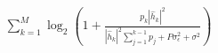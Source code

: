 \documentclass[preview]{standalone}
\begin{document}
\begin{align*}
\sum_{k=1}^{M}\log_2\left( 1 + \frac{p_k\left|{\hat{h}_k}\right|^2}{\left|{\hat{h}_k}\right|^2\sum_{j=1}^{k-1}p_j+P\sigma^2_{\epsilon} + \sigma^2} \right)
\end{align*}
\end{document}
